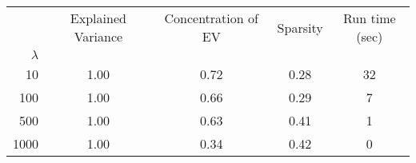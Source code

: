 \begin{tabular}{r|cccc}
\toprule
{} &  Explained Variance &  Concentration of EV &  Sparsity & Run time (sec) \\
$\lambda$ &                     &                      &           &                \\
\midrule
10        &                1.00 &                 0.72 &      0.28 &             32 \\
100       &                1.00 &                 0.66 &      0.29 &              7 \\
500       &                1.00 &                 0.63 &      0.41 &              1 \\
1000      &                1.00 &                 0.34 &      0.42 &              0 \\
\bottomrule
\end{tabular}
